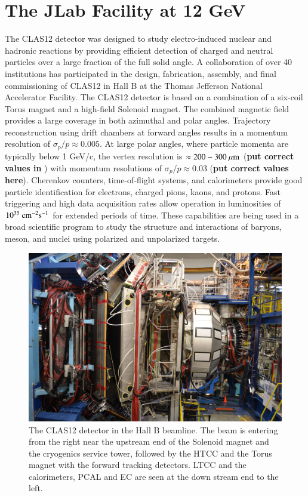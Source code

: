 \documentclass[final,3p,twocolumn]{elsarticle}
\begin{document}
\section{The JLab Facility at 12 GeV}
 \label{jlab}
 The CLAS12 detector was designed to study electro-induced nuclear and hadronic reactions by providing efficient detection of charged and neutral particles over a large fraction of the full solid angle. A collaboration of over 40 institutions has participated in the design, fabrication, assembly, and final commissioning of CLAS12 in Hall B at the Thomas Jefferson  National Accelerator Facility. The CLAS12 detector is based on a combination of a six-coil Torus magnet and a high-field Solenoid magnet. The combined magnetic field provides a large coverage in both azimuthal and polar angles. Trajectory reconstruction using drift chambers at forward angles results in a momentum resolution of ${\sigma_p / p} \approx 0.005$. At large polar angles, where particle momenta are typically below 1 GeV/c, the vertex resolution is $\approx 200-300~\mu\rm{m}$ ({\bf put correct values in} ) with momentum resolutions of $\sigma_p / p \approx 0.03$  ({\bf put correct values here}).  Cherenkov counters, time-of-flight systems, and calorimeters provide good particle identification for electrons, charged pions, kaons, and protons. Fast triggering and high data acquisition rates allow operation in luminosities of $10^{35}~\rm{cm}^{-2}\rm{s}^{-1}$ for extended periods of time. These capabilities are being used in a broad scientific program to study the structure and interactions of baryons, meson, and nuclei using polarized and unpolarized targets. 

\begin{figure}[bhtp!]
\centerline{\includegraphics[width=1.4\columnwidth]{CLAS12_photo-1.jpg}}
\caption{\footnotesize The CLAS12 detector in the Hall B beamline. The beam is entering from the right near the upstream end of the Solenoid magnet and 
the cryogenics service tower, followed by the HTCC and the Torus magnet with the forward tracking detectors.  LTCC and the calorimeters, PCAL and EC are seen at the down stream end to the left.}
\label{clas12-photo}
\end{figure}
\end{document}

